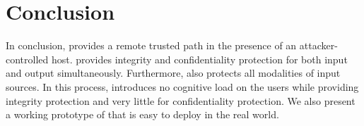 \section{Conclusion}
\label{sec:conclusion}

In conclusion, \name provides a remote trusted path in the presence of an attacker-controlled host. \name provides integrity and confidentiality protection for both input and output simultaneously. Furthermore, \name also protects all modalities of input sources. In this process, \name introduces no cognitive load on the users while providing integrity protection and very little for confidentiality protection. We also present a working prototype of \name that is easy to deploy in the real world.
